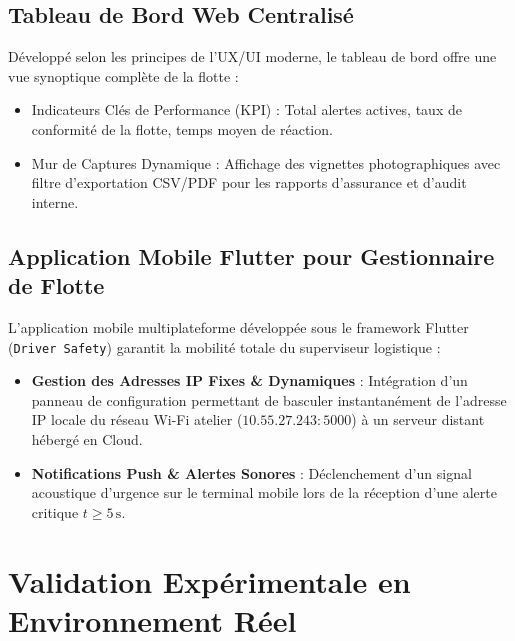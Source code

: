 \documentclass[11pt,a4paper]{article}
\begin{document}
\subsection{Tableau de Bord Web Centralisé}
Développé selon les principes de l'UX/UI moderne, le tableau de bord offre une vue synoptique complète de la flotte :
\begin{itemize}
    \item Indicateurs Clés de Performance (KPI) : Total alertes actives, taux de conformité de la flotte, temps moyen de réaction.
    \item Mur de Captures Dynamique : Affichage des vignettes photographiques avec filtre d'exportation CSV/PDF pour les rapports d'assurance et d'audit interne.
\end{itemize}

\subsection{Application Mobile Flutter pour Gestionnaire de Flotte}
L'application mobile multiplateforme développée sous le framework Flutter (\texttt{Driver Safety}) garantit la mobilité totale du superviseur logistique :
\begin{itemize}
    \item \textbf{Gestion des Adresses IP Fixes \& Dynamiques} : Intégration d'un panneau de configuration permettant de basculer instantanément de l'adresse IP locale du réseau Wi-Fi atelier ($10.55.27.243:5000$) à un serveur distant hébergé en Cloud.
    \item \textbf{Notifications Push \& Alertes Sonores} : Déclenchement d'un signal acoustique d'urgence sur le terminal mobile lors de la réception d'une alerte critique $t \ge 5\,\text{s}$.
\end{itemize}

\section{Validation Expérimentale en Environnement Réel}
\end{document}
